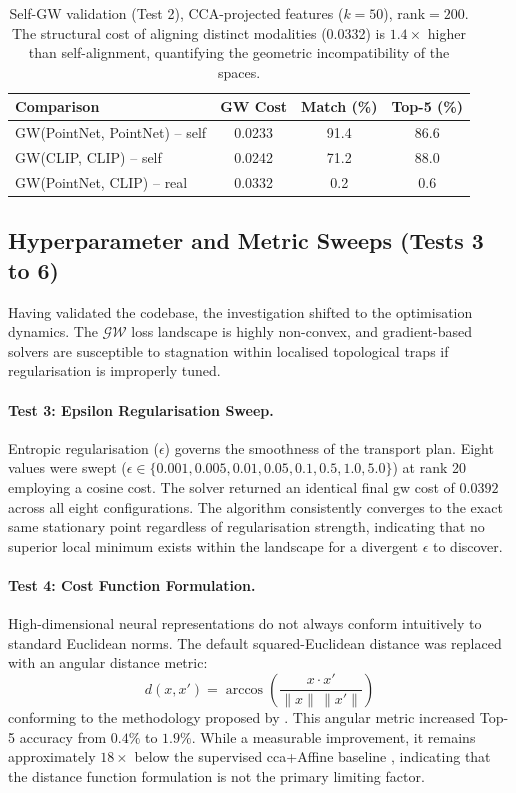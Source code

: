 \begin{table}[htpb]
\centering
\small
\begin{tabular}{lccc}
\toprule
\textbf{Comparison} & \textbf{GW Cost} & \textbf{Match (\%)} & \textbf{Top-5 (\%)} \\
\midrule
GW(PointNet, PointNet) -- self & 0.0233 & 91.4 & 86.6 \\
GW(CLIP, CLIP) -- self         & 0.0242 & 71.2 & 88.0 \\
GW(PointNet, CLIP) -- real     & 0.0332 &  0.2 &  0.6 \\
\bottomrule
\end{tabular}
\caption{Self-GW validation (Test 2), CCA-projected features ($k=50$),
rank$=200$. The structural cost of aligning distinct modalities (0.0332)
is $1.4\times$ higher than self-alignment, quantifying the geometric
incompatibility of the spaces.}
\label{tab:self_gw}
\end{table}

\subsection{Hyperparameter and Metric Sweeps (Tests 3 to 6)}
\label{subsec:hyperparameter_sweeps}

Having validated the codebase, the investigation shifted to the optimisation dynamics. The $\mathcal{GW}$ loss landscape is highly non-convex, and gradient-based solvers are susceptible to stagnation within localised topological traps if regularisation is improperly tuned.

\paragraph{Test 3: Epsilon Regularisation Sweep.}
Entropic regularisation ($\epsilon$) governs the smoothness of the transport plan. Eight values were swept ($\epsilon \in \{0.001, 0.005, 0.01, 0.05,\allowbreak 0.1, 0.5, 1.0, 5.0\}$) at rank 20 employing a cosine cost. The solver returned an identical final \gls{gw} cost of $0.0392$ across all eight configurations. The algorithm consistently converges to the exact same stationary point regardless of regularisation strength, indicating that no superior local minimum exists within the landscape for a divergent $\epsilon$ to discover.

\paragraph{Test 4: Cost Function Formulation.}
High-dimensional neural representations do not always conform intuitively to standard Euclidean norms. The default squared-Euclidean distance was replaced with an angular distance metric:
\begin{equation}
    d(x, x') = \arccos\left(\frac{x \cdot x'}{\|x\|\,\|x'\|}\right)
\end{equation}
conforming to the methodology proposed by \textcite{li2026scale}. This angular metric increased Top-5 accuracy from $0.4\%$ to $1.9\%$. While a measurable improvement, it remains approximately $18\times$ below the supervised \gls{cca}+Affine baseline \cite{hadgi2025escaping}, indicating that the distance function formulation is not the primary limiting factor.
